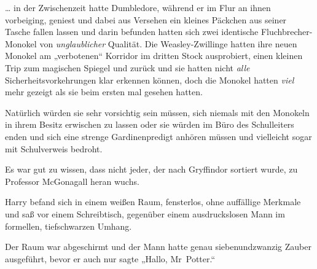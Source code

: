 … in der Zwischenzeit hatte Dumbledore, während er im Flur an ihnen vorbeiging, geniest und dabei aus Versehen ein kleines Päckchen aus seiner Tasche fallen lassen und darin befunden hatten sich zwei identische Fluchbrecher-Monokel von \emph{unglaublicher} Qualität. Die Weasley-Zwillinge hatten ihre neuen Monokel am „verbotenen“ Korridor im dritten Stock ausprobiert, einen kleinen Trip zum magischen Spiegel und zurück und sie hatten nicht \emph{alle} Sicherheitsvorkehrungen klar erkennen können, doch die Monokel hatten \emph{viel} mehr gezeigt als sie beim ersten mal gesehen hatten.

Natürlich würden sie sehr vorsichtig sein müssen, sich niemals mit den Monokeln in ihrem Besitz erwischen zu lassen oder sie würden im Büro des Schulleiters enden und sich eine strenge Gardinenpredigt anhören müssen und vielleicht sogar mit Schulverweis bedroht.

Es war gut zu wissen, dass nicht jeder, der nach Gryffindor sortiert wurde, zu Professor McGonagall heran wuchs.

\later

Harry befand sich in einem weißen Raum, fensterlos, ohne auffällige Merkmale und saß vor einem Schreibtisch, gegenüber einem ausdruckslosen Mann im formellen, tiefschwarzen Umhang.

Der Raum war abgeschirmt und der Mann hatte genau siebenundzwanzig Zauber ausgeführt, bevor er auch nur sagte „Hallo, Mr~Potter.“

